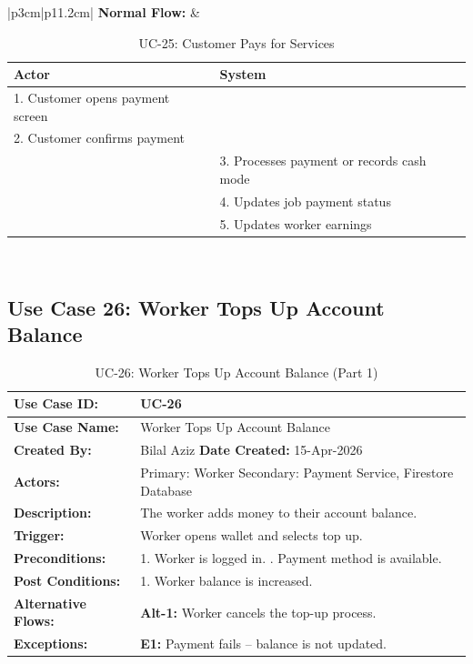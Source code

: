 \newpage

{\small
\renewcommand{\arraystretch}{1.05}
\begin{table}[H]
\centering
\begin{tabular}{|p{3cm}|p{11.2cm}|}
\hline
\textbf{Normal Flow:} &
\begin{tabular}[t]{|p{5.4cm}|p{5.4cm}|}
\hline
\textbf{Actor} & \textbf{System} \\ \hline
1. Customer opens payment screen & \\ \hline
2. Customer confirms payment & \\ \hline
 & 3. Processes payment or records cash mode \\ \hline
 & 4. Updates job payment status \\ \hline
 & 5. Updates worker earnings \\ \hline
\end{tabular} \\ \hline
\end{tabular}
\caption{UC-25: Customer Pays for Services}
\end{table}
}

\newpage

\subsection*{Use Case 26: Worker Tops Up Account Balance}

{\small
\renewcommand{\arraystretch}{1.05}
\begin{table}[H]
\centering
\begin{tabular}{|p{3cm}|p{11.2cm}|}
\hline
\textbf{Use Case ID:} & UC-26 \\ \hline
\textbf{Use Case Name:} & Worker Tops Up Account Balance \\ \hline
\textbf{Created By:} & Bilal Aziz \hfill \textbf{Date Created:} 15-Apr-2026 \\ \hline
\textbf{Actors:} & Primary: Worker \quad Secondary: Payment Service, Firestore Database \\ \hline
\textbf{Description:} & The worker adds money to their account balance. \\ \hline
\textbf{Trigger:} & Worker opens wallet and selects top up. \\ \hline
\textbf{Preconditions:} & 1. Worker is logged in. \newline 2. Payment method is available. \\ \hline
\textbf{Post Conditions:} & 1. Worker balance is increased. \\ \hline
\textbf{Alternative Flows:} & \textbf{Alt-1:} Worker cancels the top-up process. \\ \hline
\textbf{Exceptions:} & \textbf{E1:} Payment fails -- balance is not updated. \\ \hline
\end{tabular}
\caption*{UC-26: Worker Tops Up Account Balance (Part 1)}
\end{table}
}

